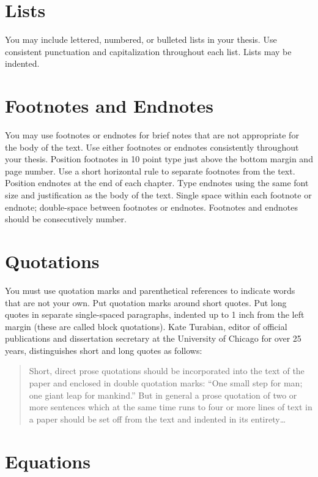 \section{Lists}

You may include lettered, numbered, or bulleted lists in your thesis.
Use consistent punctuation and capitalization throughout each list.
Lists may be indented.

\section{Footnotes and Endnotes}

You may use footnotes or endnotes for brief notes that are not appropriate for
the body of the text.  Use either footnotes or endnotes consistently throughout
your thesis.  Position footnotes in 10 point type just above the bottom margin
and page number.  Use a short horizontal rule to separate footnotes from the
text.  Position endnotes at the end of each chapter.  Type endnotes using the
same font size and justification as the body of the text.  Single space within
each footnote or endnote; double-space between footnotes or endnotes.
Footnotes and endnotes should be consecutively number.

\section{Quotations}

You must use quotation marks and parenthetical references to indicate words
that are not your own. Put quotation marks around short quotes.  Put long
quotes in separate single-spaced paragraphs, indented up to 1 inch from the
left margin (these are called block quotations).  Kate Turabian, editor of
official publications and dissertation secretary at the University of Chicago
for over 25 years, distinguishes short and long quotes as follows:

\begin{quote}
  Short, direct prose quotations should be incorporated into the text
  of the paper and enclosed in double quotation marks: ``One small step
  for man; one giant leap for mankind.'' But in general a prose
  quotation of two or more sentences which at the same time runs to
  four or more lines of text in a paper should be set off from the
  text and indented in its entirety\dots~\cite{Turabian}
\end{quote}

\section{Equations}

